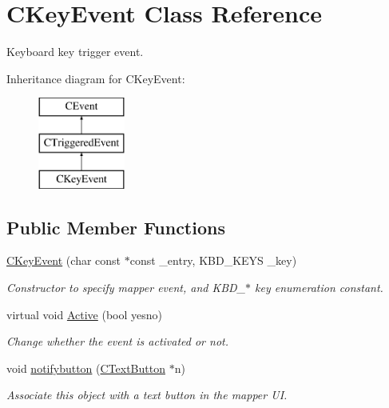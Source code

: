 \hypertarget{classCKeyEvent}{\section{C\-Key\-Event Class Reference}
\label{classCKeyEvent}
}


Keyboard key trigger event.  


Inheritance diagram for C\-Key\-Event\-:\begin{figure}[H]
\begin{center}
\leavevmode
\includegraphics[height=3.000000cm]{classCKeyEvent}
\end{center}
\end{figure}
\subsection*{Public Member Functions}
\begin{DoxyCompactItemize}
\item 
\hypertarget{classCKeyEvent_a26db3746811c8498d0f7f4ca7e52d360}{\hyperlink{classCKeyEvent_a26db3746811c8498d0f7f4ca7e52d360}{C\-Key\-Event} (char const $\ast$const \-\_\-entry, K\-B\-D\-\_\-\-K\-E\-Y\-S \-\_\-key)}\label{classCKeyEvent_a26db3746811c8498d0f7f4ca7e52d360}

\begin{DoxyCompactList}\small\item\em Constructor to specify mapper event, and K\-B\-D\-\_\-$\ast$ key enumeration constant. \end{DoxyCompactList}\item 
\hypertarget{classCKeyEvent_a184277d7cd9c41090ae646a3b9887cf3}{virtual void \hyperlink{classCKeyEvent_a184277d7cd9c41090ae646a3b9887cf3}{Active} (bool yesno)}\label{classCKeyEvent_a184277d7cd9c41090ae646a3b9887cf3}

\begin{DoxyCompactList}\small\item\em Change whether the event is activated or not. \end{DoxyCompactList}\item 
\hypertarget{classCKeyEvent_ab05ca088ef648a08242be4f03adcbc00}{void \hyperlink{classCKeyEvent_ab05ca088ef648a08242be4f03adcbc00}{notifybutton} (\hyperlink{classCTextButton}{C\-Text\-Button} $\ast$n)}\label{classCKeyEvent_ab05ca088ef648a08242be4f03adcbc00}

\begin{DoxyCompactList}\small\item\em Associate this object with a text button in the mapper U\-I. \end{DoxyCompactList}\end{DoxyCompactItemize}
